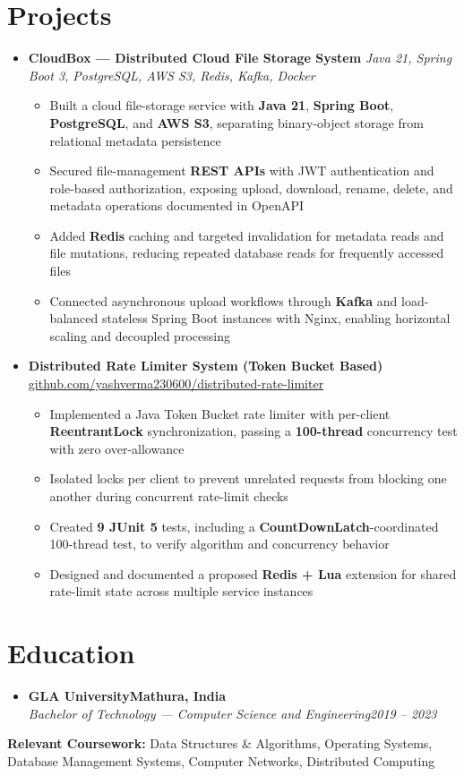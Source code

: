 \documentclass[letterpaper,11pt]{article}
\newcommand{\resumeItem}[1]{
  \item\small{{#1 \vspace{-2pt}}}
}
\newcommand{\resumeSubheading}[4]{
  \vspace{-2pt}\item
    \textbf{#1}\hfill \textbf{\small #2} \\
    \textit{\small #3}\hfill \textit{\small #4}\vspace{-7pt}
}
\newcommand{\resumeProjectHeading}[2]{
    \item
    \small #1\hfill \textbf{\small #2}\vspace{-7pt}
}
\newcommand{\resumeSubHeadingListStart}{\begin{itemize}[leftmargin=0.0in, label={}]}
\newcommand{\resumeSubHeadingListEnd}{\end{itemize}}
\newcommand{\resumeItemListStart}{\begin{itemize}}
\newcommand{\resumeItemListEnd}{\end{itemize}\vspace{-5pt}}
\begin{document}
\section{Projects}
  \resumeSubHeadingListStart
    \resumeProjectHeading
      {\textbf{CloudBox --- Distributed Cloud File Storage System} \textbar{} \textit{\small Java 21, Spring Boot 3, PostgreSQL, AWS S3, Redis, Kafka, Docker}}{}
      \resumeItemListStart
        \resumeItem{Built a cloud file-storage service with \textbf{Java 21}, \textbf{Spring Boot}, \textbf{PostgreSQL}, and \textbf{AWS S3}, separating binary-object storage from relational metadata persistence}
        \resumeItem{Secured file-management \textbf{REST APIs} with JWT authentication and role-based authorization, exposing upload, download, rename, delete, and metadata operations documented in OpenAPI}
        \resumeItem{Added \textbf{Redis} caching and targeted invalidation for metadata reads and file mutations, reducing repeated database reads for frequently accessed files}
        \resumeItem{Connected asynchronous upload workflows through \textbf{Kafka} and load-balanced stateless Spring Boot instances with Nginx, enabling horizontal scaling and decoupled processing}
      \resumeItemListEnd
    \resumeProjectHeading
      {\textbf{Distributed Rate Limiter System (Token Bucket Based)} \textbar{} \href{https://github.com/yashverma230600/distributed-rate-limiter}{github.com/yashverma230600/distributed-rate-limiter}}{}
      \resumeItemListStart
        \resumeItem{Implemented a Java Token Bucket rate limiter with per-client \textbf{ReentrantLock} synchronization, passing a \textbf{100-thread} concurrency test with zero over-allowance}
        \resumeItem{Isolated locks per client to prevent unrelated requests from blocking one another during concurrent rate-limit checks}
        \resumeItem{Created \textbf{9 JUnit 5} tests, including a \textbf{CountDownLatch}-coordinated 100-thread test, to verify algorithm and concurrency behavior}
        \resumeItem{Designed and documented a proposed \textbf{Redis + Lua} extension for shared rate-limit state across multiple service instances}
      \resumeItemListEnd
  \resumeSubHeadingListEnd
\vspace{-8pt}

\section{Education}
  \resumeSubHeadingListStart
    \resumeSubheading
      {GLA University}{Mathura, India}
      {Bachelor of Technology --- Computer Science and Engineering}{2019 -- 2023}
  \resumeSubHeadingListEnd
  \vspace{-2pt}
  \begin{itemize}[leftmargin=0.15in, label={}]
    \small{\item{
      \textbf{Relevant Coursework:} Data Structures \& Algorithms, Operating Systems, Database Management Systems, Computer Networks, Distributed Computing
    }}
  \end{itemize}
\vspace{-4pt}
\end{document}
